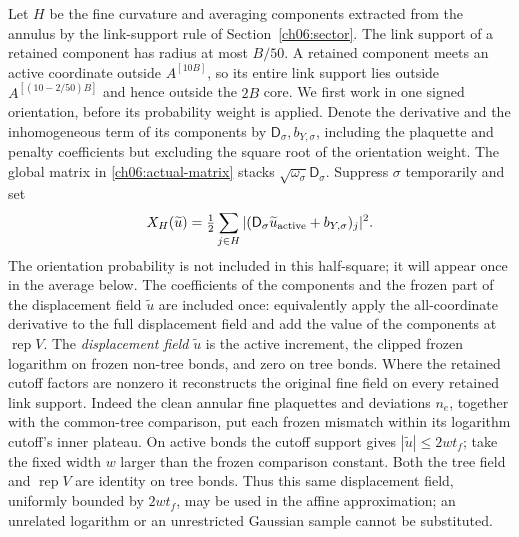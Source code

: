 Let $H$ be the fine curvature and averaging components extracted from the
annulus by the link-support rule of Section~\ref{ch06:sector}. The link support of a retained component has radius
at most $B/50$. A retained component meets an active coordinate outside
$A^{[10B]}$, so its entire link support lies outside
$A^{[(10-2/50)B]}$ and hence outside the $2B$ core.
We first work in one signed orientation, before its probability weight
is applied. Denote the derivative and the inhomogeneous term of its components by
$\mathsf D_\sigma,b_{Y,\sigma}$, including the plaquette and penalty
coefficients but excluding the square root of the orientation weight.
The global matrix in \eqref{ch06:actual-matrix} stacks
$\sqrt{\omega_\sigma}\mathsf D_\sigma$.
Suppress $\sigma$ temporarily and set
\[
 X_H(\widetilde u)=\tfrac12
       \sum_{j\in H}|(\mathsf D_\sigma\widetilde u_{\rm active}+b_{Y,\sigma})_j|^2.
\]
The orientation probability is not included in this half-square; it
will appear once in the average below. The coefficients of the components and
the frozen part of the displacement field $\widetilde u$ are included once: equivalently apply the all-coordinate derivative to
the full displacement field and add the value of the components at $\operatorname{rep}V$. The \emph{displacement field} $\widetilde u$
is the active increment, the clipped frozen logarithm on frozen
non-tree bonds, and zero on tree bonds. Where the retained cutoff factors are nonzero
it reconstructs the original fine field on every retained link support.
Indeed the clean annular fine plaquettes and deviations $n_e$,
together with the common-tree comparison, put each frozen mismatch
within its logarithm cutoff's inner plateau. On active bonds the
cutoff support gives $|\widetilde u|\le2w t_f$; take the fixed width $w$
larger than the frozen comparison constant. Both the tree field and $\operatorname{rep}V$
are identity on tree bonds. Thus this same displacement field, uniformly bounded
by $2w t_f$, may be used in the affine approximation; an unrelated
logarithm or an unrestricted Gaussian sample cannot be substituted.

